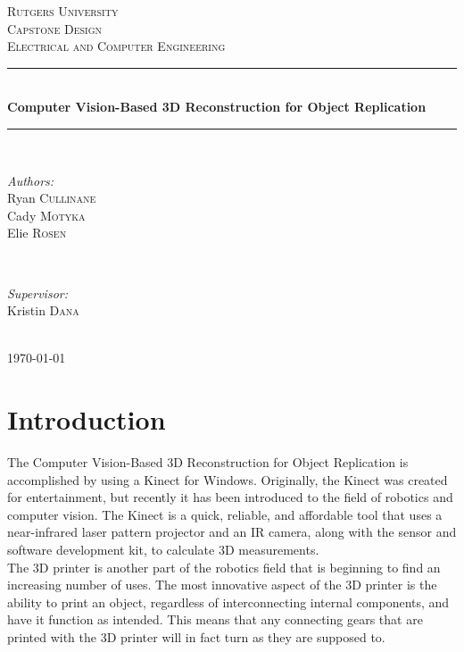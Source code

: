 \documentclass[12pt,twocolumn]{article}
\begin{document}
\begin{titlepage}
\newcommand{\HRule}{\rule{\linewidth}{0.5mm}}
\center
\textsc{\LARGE Rutgers University}\\[1.5cm] 
\textsc{\Large Capstone Design}\\[0.5cm] 
\textsc{\large Electrical and Computer Engineering}\\[0.5cm]
\HRule \\[0.4cm]
{ \huge \bfseries Computer Vision-Based 3D Reconstruction for Object Replication}\\[0.4cm] 
\HRule \\[1.5cm]
\begin{minipage}{0.4\textwidth}
\begin{flushleft} \large
\emph{Authors:}\\
Ryan \textsc{Cullinane}\\
Cady \textsc{Motyka}\\
Elie \textsc{Rosen}
\end{flushleft}
\end{minipage}
~
\begin{minipage}{0.4\textwidth}
\begin{flushright} \large
\emph{Supervisor:} \\
Kristin \textsc{Dana} 
\end{flushright}
\end{minipage}\\[4cm]
{\large \today}\\[3cm]
\vfill 
\end{titlepage}

\section{Introduction}
The Computer Vision-Based 3D Reconstruction for Object Replication is accomplished by using a Kinect for Windows. Originally, the Kinect was created for entertainment, but recently it has been introduced to the field of robotics and computer vision. The Kinect is a quick, reliable, and affordable tool that uses a near-infrared laser pattern projector and an IR camera, along with the sensor and software development kit, to calculate 3D measurements.  \\
\indent The 3D printer is another part of the robotics field that is beginning to find an increasing number of uses. The most innovative aspect of the 3D printer is the ability to print an object, regardless of interconnecting internal components, and have it function as intended. This means that any connecting gears that are printed with the 3D printer will in fact turn as they are supposed to. \\
\end{document}
